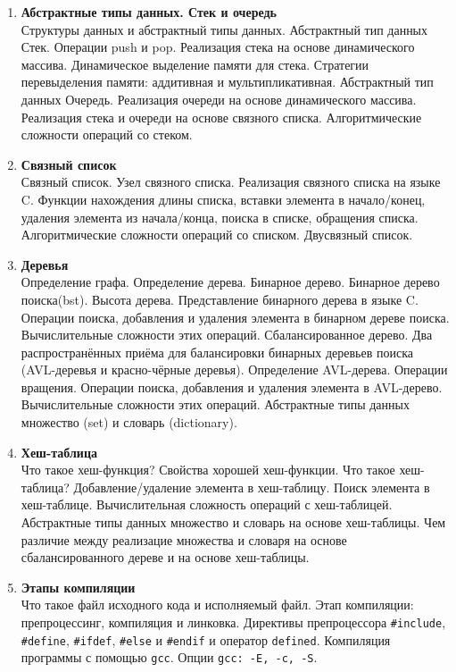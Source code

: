 \documentclass{article}
\begin{document}
\begin{enumerate}
\item  \textbf{Абстрактные типы данных. Стек и очередь}\\
Структуры данных и абстрактный типы данных. Абстрактный тип данных Стек. Операции push и pop. Реализация стека на основе динамического массива. Динамическое выделение памяти для стека. Стратегии перевыделения памяти: аддитивная и мультипликативная. Абстрактный тип данных Очередь. Реализация очереди на основе динамического массива. Реализация стека и очереди на основе связного списка. Алгоритмические сложности операций со стеком.

\item \textbf{Связный список}\\
Связный список. Узел связного списка. Реализация связного списка на языке C. Функции нахождения длины списка, вставки элемента в начало/конец, удаления элемента из начала/конца, поиска в списке, обращения списка. Алгоритмические сложности операций со списком. Двусвязный список.


\item \textbf{Деревья}\\
Определение графа. Определение дерева. Бинарное дерево. Бинарное дерево поиска(bst). Высота дерева. Представление бинарного дерева в языке C. Операции поиска, добавления и удаления элемента в бинарном дереве поиска. Вычислительные сложности этих операций. Сбалансированное дерево. Два распространённых приёма для балансировки бинарных деревьев поиска (AVL-деревья и красно-чёрные деревья). Определение AVL-дерева. Операции вращения. Операции поиска, добавления и удаления элемента в AVL-дерево. Вычислительные сложности этих операций. Абстрактные типы данных множество (set) и словарь (dictionary).


\item \textbf{Хеш-таблица}\\
Что такое хеш-функция? Свойства хорошей хеш-функции. Что такое хеш-таблица? Добавление/удаление элемента в хеш-таблицу. Поиск элемента в хеш-таблице. Вычислительная сложность операций с хеш-таблицей. Абстрактные типы данных множество и словарь на основе хеш-таблицы. Чем различие между реализацие множества и словаря на основе сбалансированного дереве и на основе хеш-таблицы.



\item \textbf{Этапы компиляции}\\
Что такое файл исходного кода и исполняемый файл. Этап компиляции: препроцессинг, компиляция и линковка. Директивы препроцессора \texttt{\#include}, \texttt{\#define}, \texttt{\#ifdef}, \texttt{\#else} и \texttt{\#endif} и оператор \texttt{defined}. Компиляция программы с помощью \texttt{gcc}. Опции \texttt{gcc: -E, -c, -S}.



\end{enumerate}
\end{document}
